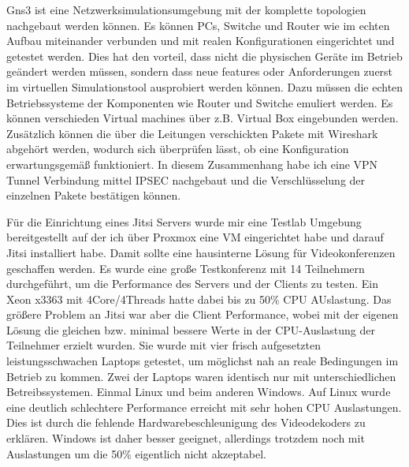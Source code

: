 \documentclass[english,runningheads,a4paper]{llncs}[2018/03/10]
\begin{document}
Gns3 ist eine Netzwerksimulationsumgebung mit der komplette topologien nachgebaut werden können. Es können PCs, Switche und Router wie im echten Aufbau miteinander verbunden und mit realen Konfigurationen eingerichtet und getestet werden. Dies hat den vorteil, dass nicht die physischen Geräte im Betrieb geändert werden müssen, sondern dass neue features oder Anforderungen zuerst im virtuellen Simulationstool ausprobiert werden können. Dazu müssen die echten Betriebssysteme der Komponenten wie Router und Switche emuliert werden. Es können verschieden Virtual machines über z.B. Virtual Box eingebunden werden. Zusätzlich können die über die Leitungen verschickten Pakete mit Wireshark abgehört werden, wodurch sich überprüfen lässt, ob eine Konfiguration erwartungsgemäß funktioniert. In diesem Zusammenhang habe ich eine VPN Tunnel Verbindung mittel IPSEC nachgebaut und die Verschlüsselung der einzelnen Pakete bestätigen können.

Für die Einrichtung eines Jitsi Servers wurde mir eine Testlab Umgebung bereitgestellt auf der ich über Proxmox eine VM eingerichtet habe und darauf Jitsi installiert habe. Damit sollte eine hausinterne Lösung für Videokonferenzen geschaffen werden. Es wurde eine große Testkonferenz mit 14 Teilnehmern durchgeführt, um die Performance des Servers und der Clients zu testen. Ein Xeon x3363 mit 4Core/4Threads hatte dabei bis zu 50\% CPU AUslastung. Das größere Problem an Jitsi war aber die Client Performance, wobei mit der eigenen Lösung die  gleichen bzw. minimal  bessere Werte in der CPU-Auslastung der Teilnehmer erzielt wurden. Sie wurde mit vier frisch aufgesetzten leistungsschwachen Laptops getestet, um möglichst nah an reale Bedingungen im Betrieb zu kommen. Zwei der Laptops waren identisch nur mit unterschiedlichen Betreibssystemen. Einmal Linux und beim anderen Windows. Auf Linux wurde eine deutlich schlechtere Performance erreicht mit sehr hohen CPU Auslastungen. Dies ist durch die fehlende Hardwarebeschleunigung des Videodekoders zu erklären. Windows ist daher besser geeignet, allerdings trotzdem noch mit Auslastungen um die 50\% eigentlich nicht akzeptabel.
\end{document}

